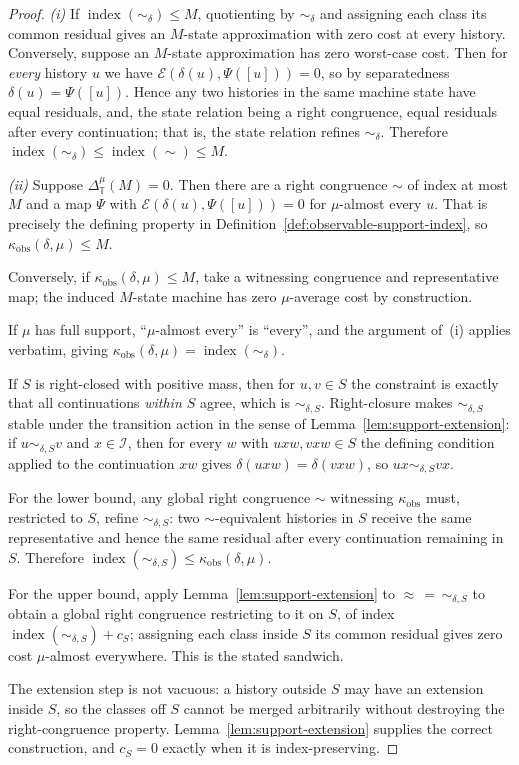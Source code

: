 \documentclass[12pt]{article}
\theoremstyle{definition}
\begin{document}
\begin{proof}
\emph{(i)} If $\operatorname{index}(\sim_\delta)\le M$, quotienting by
$\sim_\delta$ and assigning each class its common residual gives an $M$-state
approximation with zero cost at every history.  Conversely, suppose an
$M$-state approximation has zero worst-case cost.  Then for \emph{every}
history $u$ we have $\mathcal E(\delta(u),\Psi([u]))=0$, so by separatedness
$\delta(u)=\Psi([u])$.  Hence any two histories in the same machine state have
equal residuals, and, the state relation being a right congruence, equal
residuals after every continuation; that is, the state relation refines
$\sim_\delta$.  Therefore
$\operatorname{index}(\sim_\delta)\le\operatorname{index}(\sim)\le M$.

\emph{(ii)} Suppose $\Delta_{\mathbb T}^{\mu}(M)=0$.  Then there are a right
congruence $\sim$ of index at most $M$ and a map $\Psi$ with
$\mathcal E(\delta(u),\Psi([u]))=0$ for $\mu$-almost every $u$.  That is
precisely the defining property in
Definition~\ref{def:observable-support-index}, so
$\kappa_{\mathrm{obs}}(\delta,\mu)\le M$.

Conversely, if $\kappa_{\mathrm{obs}}(\delta,\mu)\le M$, take a witnessing
congruence and representative map; the induced $M$-state machine has zero
$\mu$-average cost by construction.

If $\mu$ has full support, ``$\mu$-almost every'' is ``every'', and the
argument of~(i) applies verbatim, giving
$\kappa_{\mathrm{obs}}(\delta,\mu)=\operatorname{index}(\sim_\delta)$.

If $S$ is right-closed with positive mass, then for $u,v\in S$ the constraint
is exactly that all continuations \emph{within $S$} agree, which is
$\sim_{\delta,S}$.  Right-closure makes $\sim_{\delta,S}$ stable under the
transition action in the sense of Lemma~\ref{lem:support-extension}: if
$u\sim_{\delta,S}v$ and $x\in\mathcal I$, then for every $w$ with
$uxw,vxw\in S$ the defining condition applied to the continuation $xw$ gives
$\delta(uxw)=\delta(vxw)$, so $ux\sim_{\delta,S}vx$.

For the lower bound, any global right congruence $\sim$ witnessing
$\kappa_{\mathrm{obs}}$ must, restricted to $S$, refine $\sim_{\delta,S}$: two
$\sim$-equivalent histories in $S$ receive the same representative and hence
the same residual after every continuation remaining in $S$.  Therefore
$\operatorname{index}(\sim_{\delta,S})\le\kappa_{\mathrm{obs}}(\delta,\mu)$.

For the upper bound, apply Lemma~\ref{lem:support-extension} to
$\approx\,=\,\sim_{\delta,S}$ to obtain a global right congruence restricting
to it on $S$, of index $\operatorname{index}(\sim_{\delta,S})+c_S$; assigning
each class inside $S$ its common residual gives zero cost $\mu$-almost
everywhere.  This is the stated sandwich.

The extension step is not vacuous: a history outside $S$ may have an extension
inside $S$, so the classes off $S$ cannot be merged arbitrarily without
destroying the right-congruence property.  Lemma~\ref{lem:support-extension}
supplies the correct construction, and $c_S=0$ exactly when it is
index-preserving.
\end{proof}
\end{document}
